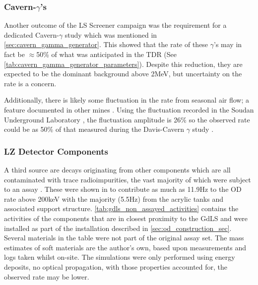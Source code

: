 \subsubsection{Cavern-$\gamma$'s}
\par
Another outcome of the LS Screener campaign was the requirement for a dedicated Cavern-$\gamma$ study which was mentioned in \autoref{sec:cavern_gamma_generator}.
This showed that the rate of these $\gamma$'s may in fact be $\approx$50\% of what was anticipated in the TDR \cite{LZ_TechnicalDesignReview_ref} (See \autoref{tab:cavern_gamma_generator_parameters}).
Despite this reduction, they are expected to be the dominant background above 2MeV, but uncertainty on the rate is a concern.
\par
Additionally, there is likely some fluctuation in the rate from seasonal air flow; a feature documented in other mines \cite{finnish_mine_radon_ref,nepal_mine_radon_ref,minos_annual_modulation_ref}.
Using the fluctuation recorded in the Soudan Underground Laboratory \cite{cavern_gammas_in_Soudan_mine_ref}, the fluctuation amplitude is 26\% so the observed rate could be as 50\% of that measured during the Davis-Cavern $\gamma$ study \cite{LZ_Gamma_Ray_Background_ref}. 

\subsubsection{LZ Detector Components}
\par
A third source are decays originating from other components which are all contaminated with trace radioimpurities, the vast majority of which were subject to an assay \cite{LZ_assay_ref}.
These were shown in \cite{scotthaselschwardt_thesis_ref} to contribute as much as 11.9Hz to the OD rate above 200keV with the majority (5.5Hz) from the acrylic tanks and associated support structure.
\autoref{tab:gdls_non_assayed_activities} contains the activities of the components that are in closest proximity to the GdLS and were installed as part of the installation described in \autoref{sec:od_construction_sec}.
Several materials in the table were not part of the original assay set.
The mass estimates of soft materials are the author's own, based upon measurements and logs taken whilst on-site.
The simulations were only performed using energy deposits, no optical propagation, with those properties accounted for, the observed rate may be lower.

